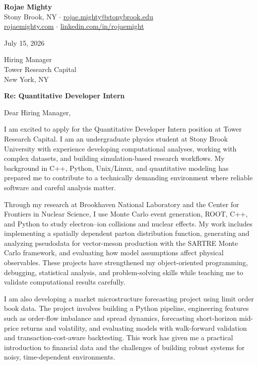 \documentclass[10pt,letterpaper]{article}
\begin{document}
\textbf{Rojae Mighty}\\
Stony Brook, NY \quad$\cdot$\quad
\href{mailto:rojae.mighty@stonybrook.edu}{rojae.mighty@stonybrook.edu}\\
\href{https://rojaemighty.com}{rojaemighty.com} \quad$\cdot$\quad
\href{https://www.linkedin.com/in/rojaemight/}{linkedin.com/in/rojaemight}

\vspace{8pt}
July 15, 2026

\vspace{8pt}
Hiring Manager\\
Tower Research Capital\\
New York, NY

\vspace{8pt}
\textbf{Re: Quantitative Developer Intern}

\vspace{4pt}
Dear Hiring Manager,

I am excited to apply for the Quantitative Developer Intern position at Tower Research Capital. I am an undergraduate physics student at Stony Brook University with experience developing computational analyses, working with complex datasets, and building simulation-based research workflows. My background in C++, Python, Unix/Linux, and quantitative modeling has prepared me to contribute to a technically demanding environment where reliable software and careful analysis matter.

Through my research at Brookhaven National Laboratory and the Center for Frontiers in Nuclear Science, I use Monte Carlo event generation, ROOT, C++, and Python to study electron--ion collisions and nuclear effects. My work includes implementing a spatially dependent parton distribution function, generating and analyzing pseudodata for vector-meson production with the SARTRE Monte Carlo framework, and evaluating how model assumptions affect physical observables. These projects have strengthened my object-oriented programming, debugging, statistical analysis, and problem-solving skills while teaching me to validate computational results carefully.

I am also developing a market microstructure forecasting project using limit order book data. The project involves building a Python pipeline, engineering features such as order-flow imbalance and spread dynamics, forecasting short-horizon mid-price returns and volatility, and evaluating models with walk-forward validation and transaction-cost-aware backtesting. This work has given me a practical introduction to financial data and the challenges of building robust systems for noisy, time-dependent environments.
\end{document}

